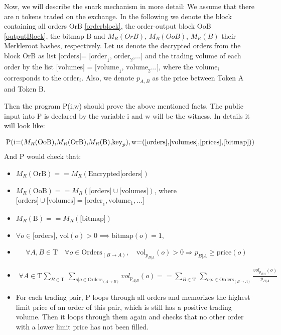 \documentclass[11pt,parskip=full]{scrartcl}%
\newcommand{\Tau}{\mathrm{T}}
\begin{document}
Now, we will describe the snark mechanism in more detail: We assume that there are n tokens traded on the exchange. 
In the following we denote the block containing all orders OrB \ref{orderblock}, the order-output block OoB \ref{outputBlock}, the bitmap B and $M_R(OrB)$, $M_R(OoB)$, $M_R(B)$ their Merkleroot hashes, respectively.
Let us denote the decrypted orders from the block OrB as list $\text{[orders]= [order}_1\text{, order}_2\text{,...]}$ and the trading volume of each order by the list $\text{[volumes] = [volume}_1\text{, volume}_2\text{...]}$, where the $\text{volume}_i$ corresponds to the $\text{order}_i$. 
Also, we denote  $p_{A,B}$ as the price between Token A and Token B. 

Then the program P(i,w) should prove the above mentioned facts. 
The public input into P is declared by the variable i and w will be the witness. 
In details it will look like:

\begin{equation}
\text{P(i=(}M_R\text{(OoB),}M_R\text{(OrB),}M_R\text{(B),} \text{key}_p),\\
\text{w=([orders],[volumes],[prices],[bitmap]))} 
\end{equation}
And P would check that:
\begin{itemize}
\item  $M_R(\text{OrB}) == M_R(\text{Encrypted[orders]})$
\item  $M_R(\text{OoB}) == M_R(\text{[orders]} \cup \text{[volumes]})$,\newline
where $\text{[orders]} \cup \text{[volumes]} = \text{[order}_1, \text{volume}_1, ...] $
\item $ M_R(\text{B}) == M_R(\text{[bitmap]})$
\item $\forall o \in \text{[orders], vol}(o)>0 \implies \text{bitmap}(o) = 1 $, 

\item 
\begin{equation} \forall A,B \in \Tau  \quad \forall o \in \text{Orders}_{(B\rightarrow A)}, \quad \text{vol}_{p_{B|A}}(o)>0 \Rightarrow p_{B|A}\geq \text{price}(o)
\end{equation}
\item 
\begin{equation}
\begin{split}
\forall A \in \Tau \sum_{B\in \Tau} \,
\sum_{o| o\in \text{Orders}_{(A\rightarrow B)}} vol_{p_{A|B}}(o) == \sum_{B\in \Tau} \, \sum_{o| o\in \text{Orders}_{(B\rightarrow A)}} \frac{vol_{p_{B|A}}(o)}{p_{B|A}}
\end{split}
\end{equation}
\item For each trading pair, P loops through all orders and memorizes the highest limit price of an order of this pair, which is still has a positive trading volume. 
Then it loops through them again and checks that no other order with a lower limit price has not been filled. 
\end{itemize}
\end{document}

